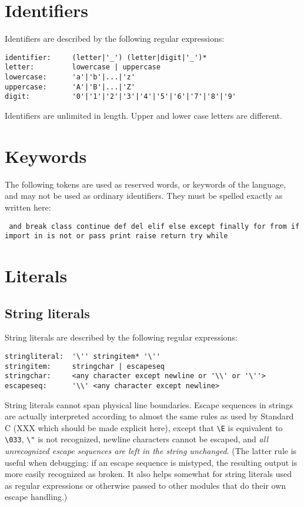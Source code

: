 \section{Identifiers}

Identifiers are described by the following regular expressions:

\begin{verbatim}
identifier:     (letter|'_') (letter|digit|'_')*
letter:         lowercase | uppercase
lowercase:      'a'|'b'|...|'z'
uppercase:      'A'|'B'|...|'Z'
digit:          '0'|'1'|'2'|'3'|'4'|'5'|'6'|'7'|'8'|'9'
\end{verbatim}

Identifiers are unlimited in length.
Upper and lower case letters are different.

\section{Keywords}

The following tokens are used as reserved words,
or keywords of the language,
and may not be used as ordinary identifiers.
They must be spelled exactly as written here:

{\tt
	and
	break
	class
	continue
	def
	del
	elif
	else
	except
	finally
	for
	from
	if
	import
	in
	is
	not
	or
	pass
	print
	raise
	return
	try
	while
}

\section{Literals}

\subsection{String literals}

String literals are described by the following regular expressions:

\begin{verbatim}
stringliteral:  '\'' stringitem* '\''
stringitem:     stringchar | escapeseq
stringchar:     <any character except newline or '\\' or '\''>
escapeseq:      '\\' <any character except newline>
\end{verbatim}

String literals cannot span physical line boundaries.
Escape sequences in strings are actually interpreted according to almost the
same rules as used by Standard C
(XXX which should be made explicit here),
except that \verb/\E/ is equivalent to \verb/\033/,
\verb/\"/ is not recognized,
newline characters cannot be escaped, and
{\em all unrecognized escape sequences are left in the string unchanged}.
(The latter rule is useful when debugging: if an escape sequence is
mistyped, the resulting output is more easily recognized as broken.
It also helps somewhat for string literals used as regular expressions
or otherwise passed to other modules that do their own escape handling.)

